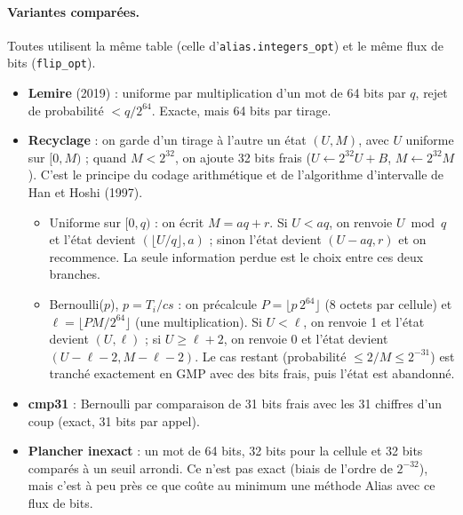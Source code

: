 \documentclass[11pt,a4paper]{article}
\newcommand{\code}[1]{\texttt{#1}}
\newcommand{\cs}{\mathit{cs}}
\begin{document}
\paragraph{Variantes comparées.} Toutes utilisent la même table (celle
d'\code{alias.integers\_opt}) et le même flux de bits (\code{flip\_opt}).
\begin{itemize}
\item \textbf{Lemire} (2019) : uniforme par multiplication d'un mot de 64 bits par $q$,
  rejet de probabilité $< q/2^{64}$. Exacte, mais 64 bits par tirage.
\item \textbf{Recyclage} : on garde d'un tirage à l'autre un état $(U, M)$, avec $U$
  uniforme sur $[0, M)$ ; quand $M < 2^{32}$, on ajoute 32 bits frais
  ($U \leftarrow 2^{32}U + B$, $M \leftarrow 2^{32}M$). C'est le principe du codage
  arithmétique et de l'algorithme d'intervalle de Han et Hoshi (1997).
  \begin{itemize}
  \item Uniforme sur $[0, q)$ : on écrit $M = aq + r$. Si $U < aq$, on renvoie
    $U \bmod q$ et l'état devient $(\lfloor U/q \rfloor, a)$ ; sinon l'état devient
    $(U - aq, r)$ et on recommence. La seule information perdue est le choix entre ces
    deux branches.
  \item Bernoulli($p$), $p = T_i/\cs$ : on précalcule $P = \lfloor p\,2^{64} \rfloor$
    (8 octets par cellule) et $\ell = \lfloor P M / 2^{64} \rfloor$ (une
    multiplication). Si $U < \ell$, on renvoie 1 et l'état devient $(U, \ell)$ ; si
    $U \ge \ell + 2$, on renvoie 0 et l'état devient $(U - \ell - 2, M - \ell - 2)$.
    Le cas restant (probabilité $\le 2/M \le 2^{-31}$) est tranché exactement en GMP
    avec des bits frais, puis l'état est abandonné.
  \end{itemize}
\item \textbf{cmp31} : Bernoulli par comparaison de 31 bits frais avec les 31 chiffres
  d'un coup (exact, 31 bits par appel).
\item \textbf{Plancher inexact} : un mot de 64 bits, 32 bits pour la cellule et 32 bits
  comparés à un seuil arrondi. Ce n'est pas exact (biais de l'ordre de $2^{-32}$), mais
  c'est à peu près ce que coûte au minimum une méthode Alias avec ce flux de bits.
\end{itemize}
\end{document}
